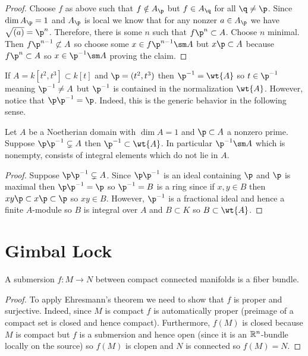 \documentclass[12pt]{article}
\begin{document}
\begin{proof}
Choose $f$ as above such that $f \notin A_\p$ but $f \in A_{\q}$ for all $\q \neq \p$. Since $\dim{A_\p} = 1$ and $A_\p$ is local we know that for any nonzer $a \in A_\p$ we have $\sqrt{(a)} = \p^n$. Therefore, there is some $n$ such that $f \p^n \subset A$. Choose $n$ minimal. Then $f \p^{n-1} \not\subset A$ so choose some $x \in f \p^{n-1} \sm A$ but $x \p \subset A$ because $f \p^n \subset A$ so $x \in \p^{-1} \sm A$ proving the claim.
\end{proof}

\begin{rmk}
If $A = k[t^2, t^3] \subset k[t]$ and $\p = (t^2, t^3)$ then $\p^{-1} = \wt{A}$ so $t \in \p^{-1}$ meaning $\p^{-1} \neq A$ but $\p^{-1}$ is contained in the normalization $\wt{A}$. However, notice that $\p \p^{-1} = \p$. Indeed, this is the generic behavior in the following sense.
\end{rmk}

\begin{prop}
Let $A$ be a Noetherian domain with $\dim{A} = 1$ and $\p \subset A$ a nonzero prime. Suppose $\p \p^{-1} \subsetneq A$ then $\p^{-1} \subset \wt{A}$. In particular $\p^{-1} \sm A$ which is nonempty, consists of integral elements which do not lie in $A$.
\end{prop}

\begin{proof}
Suppose $\p \p^{-1} \subsetneq A$. Since $\p \p^{-1}$ is an ideal containing $\p$ and $\p$ is maximal then $\p \p^{-1} = \p$ so $\p^{-1} = B$ is a ring since if $x,y \in B$ then $xy \p \subset x \p \subset \p$ so $xy \in B$. However, $\p^{-1}$ is a fractional ideal and hence a finite $A$-module so $B$ is integral over $A$ and $B \subset K$ so $B \subset \wt{A}$.
\end{proof}

\section{Gimbal Lock}

\begin{lemma}
A submersion $f : M \to N$ between compact connected manifolds is a fiber bundle.
\end{lemma}

\begin{proof}
To apply Ehresmann's theorem we need to show that $f$ is proper and surjective. Indeed, since $M$ is compact $f$ is automatically proper (preimage of a compact set is closed and hence compact). Furthermore, $f(M)$ is closed because $M$ is compact but $f$ is a submersion and hence open (since it is an $\mathbb{R}^n$-bundle locally on the source) so $f(M)$ is clopen and $N$ is connected so $f(M) = N$.
\end{proof}
\end{document}

